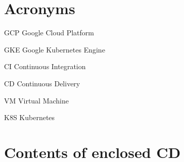 \documentclass[thesis=B,english]{FITthesis}[2019/12/23]
\begin{document}




\appendix

\chapter{Acronyms}
\begin{description}
	\item{GCP} Google Cloud Platform
	\item{GKE} Google Kubernetes Engine
	\item{CI} Continuous Integration
	\item{CD} Continuous Delivery
	\item{VM} Virtual Machine
	\item{K8S} Kubernetes
	
\end{description}


\chapter{Contents of enclosed CD}


\end{document}
